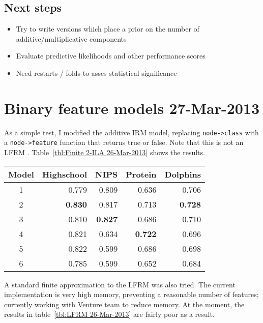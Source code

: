 \documentclass[twoside,11pt]{article}
\begin{document}
\subsection{Next steps}

\begin{itemize}
\item Try to write versions which place a prior on the number of additive/multiplicative components
\item Evaluate predictive likelihoods and other performance scores
\item Need restarts / folds to asses statistical significance
\end{itemize}

\section{Binary feature models 27-Mar-2013}

As a simple test, I modified the additive IRM model, replacing \texttt{node->class} with a \texttt{node->feature} function that returns true or false.
Note that this is not an LFRM \citep{Miller2009}.
Table~\ref{tbl:Finite 2-ILA 26-Mar-2013} shows the results.

\begin{table*}[ht!]
\caption{{\small
Finite 2-ILA - AUCs
}}
\label{tbl:Finite 2-ILA 26-Mar-2013}
\begin{center}
\begin{tabular}{c | r r r r}
Model & Highschool & NIPS & Protein & Dolphins \\
\hline
1 & 0.779 & 0.809 & 0.636 & 0.706 \\
2 & \textbf{0.830} & 0.817 & 0.713 & \textbf{0.728} \\
3 & 0.810 & \textbf{0.827} & 0.686 & 0.710 \\
4 & 0.821 & 0.634 & \textbf{0.722} & 0.696 \\
5 & 0.822 & 0.599 & 0.686 & 0.698 \\
6 & 0.785 & 0.599 & 0.652 & 0.684
\end{tabular}
\end{center}
\end{table*}

A standard finite approximation to the LFRM was also tried.
The current implementation is very high memory, preventing a reasonable number of features; currently working with Venture team to reduce memory.
At the moment, the results in table~\ref{tbl:LFRM 26-Mar-2013} are fairly poor as a result.
\end{document}
